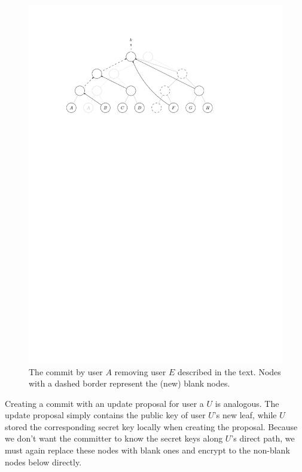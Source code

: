 \begin{figure}
	\begin{center}
		\includegraphics{figures/treekem-remove}
	\end{center}
	\caption{The commit by user $A$ removing user $E$ described in the text. Nodes with a dashed border represent the (new) blank nodes.}\label{fig:treekem-remove}
\end{figure}

Creating a commit with an update proposal for user a $U$ is analogous. The update proposal simply contains the public key of user $U$'s new leaf, while $U$ stored the corresponding secret key locally when creating the proposal. Because we don't want the committer to know the secret keys along $U$'s direct path, we must again replace these nodes with blank ones and encrypt to the non-blank nodes below directly.

